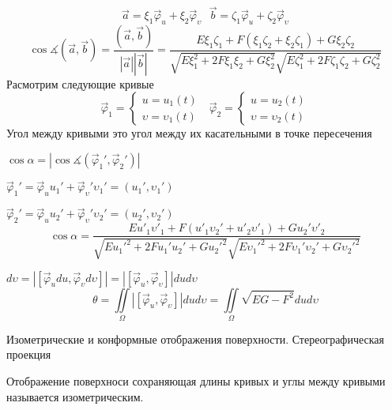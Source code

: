 \begin{block}
  $$
  \vec a = \xi_1 \vec \varphi_u + \xi_2 \vec \varphi_{\upsilon} ~~~
  \vec b = \zeta_1 \vec \varphi_u + \zeta_2 \vec \varphi_{\upsilon}
  $$
  $$
  \cos \measuredangle (\vec a, \vec b) =
  \frac{(\vec a, \vec b)}{|\vec a||\vec b|} =
  \frac{E \xi_1 \zeta_1 + F(\xi_1 \zeta_2 + \xi_2 \zeta_1) + G\xi_2 \zeta_2}
  {\sqrt{E\xi_1^2 + 2F\xi_1\xi_2 + G\xi_2^2}
  \sqrt{E\zeta_1^2 + 2F\zeta_1\zeta_2 + G\zeta_2^2}}
  $$
  Расмотрим следующие кривые
  $$
  \vec \varphi_1 =
  \left\{
    \begin{array}{l}
      u = u_1(t) \\
      \upsilon = \upsilon_1(t)
    \end{array}
  \right. ~~~
  \vec \varphi_2 =
  \left\{
    \begin{array}{l}
      u = u_2(t) \\
      \upsilon = \upsilon_2(t)
    \end{array}
  \right.
  $$
  Угол между кривыми это угол между их касательными в точке пересечения

  $\cos \alpha = |\cos \measuredangle (\vec \varphi_1', \vec \varphi_2')|$

  $\vec \varphi_1' = \vec \varphi_u u_1' + \vec \varphi_{\upsilon}'
  \upsilon_1' = (u_1', \upsilon_1')$

  $\vec \varphi_2' = \vec \varphi_u u_2' + \vec \varphi_{\upsilon}'
  \upsilon_2' = (u_2', \upsilon_2')$
  $$
  \cos \alpha = \frac{Eu'_1 \upsilon'_1 + F(u'_1\upsilon_2' + u'_2 \upsilon'_1)
  + Gu_2' \upsilon'_2}
  {\sqrt{Eu_1'^2 + 2Fu_1'u_2' + Gu_2'^2}
  \sqrt{E\upsilon_1'^2 + 2F\upsilon_1'\upsilon_2' + G\upsilon_2'^2}}
  $$
\end{block}

\begin{block}
  $d\upsilon = |[\vec \varphi_u du, \vec \varphi_{\upsilon} d\upsilon]| =
  |[\vec \varphi_u, \vec \varphi_{\upsilon}]| du d\upsilon$
  $$
  \theta = \iint \limits_{\Omega} |[\vec \varphi_u, \vec \varphi_{\upsilon}]|
  du d\upsilon = \iint \limits_{\Omega} \sqrt{EG - F^2}dud\upsilon
  $$
\end{block}

\begin{title}[\Large]
  Изометрические и конформные отображения поверхности. Стереографическая
  проекция
\end{title}

\begin{define}
  Отображение поверхноси сохраняющая длины кривых и углы между кривыми
  называется изометрическим.
\end{define}

